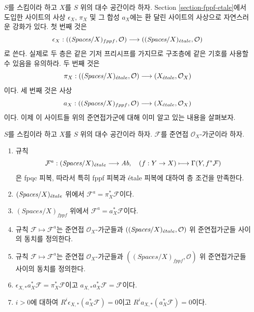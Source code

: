 \medskip\noindent
$S$를 스킴이라 하고 $X$를 $S$ 위의 대수 공간이라 하자.
Section \ref{section-fppf-etale}에서 도입한 사이트의 사상
$\epsilon_X$, $\pi_X$ 및 그 합성 $a_X$에는 환 달린 사이트의 사상으로
자연스러운 강화가 있다. 첫 번째 것은
$$
\epsilon_X :
((\textit{Spaces}/X)_{fppf}, \mathcal{O})
\longrightarrow
((\textit{Spaces}/X)_{\acute{e}tale}, \mathcal{O})
$$
로 쓴다. 실제로 두 층은 같은 기저 프리시프를 가지므로 구조층에
같은 기호를 사용할 수 있음을 유의하라. 두 번째 것은
$$
\pi_X :
((\textit{Spaces}/X)_{\acute{e}tale}, \mathcal{O})
\longrightarrow
(X_{\acute{e}tale}, \mathcal{O}_X)
$$
이다. 세 번째 것은 사상
$$
a_X :
((\textit{Spaces}/X)_{fppf}, \mathcal{O})
\longrightarrow
(X_{\acute{e}tale}, \mathcal{O}_X)
$$
이다. 이제 이 사이트들 위의 준연접가군에 대해 이미 알고 있는
내용을 살펴보자.

\begin{lemma}
\label{lemma-review-quasi-coherent}
$S$를 스킴이라 하고 $X$를 $S$ 위의 대수 공간이라 하자.
$\mathcal{F}$를 준연접 $\mathcal{O}_X$-가군이라 하자.
\begin{enumerate}
\item 규칙
$$
\mathcal{F}^a : (\textit{Spaces}/X)_{\acute{e}tale} \longrightarrow \textit{Ab},\quad
(f : Y \to X) \longmapsto \Gamma(Y, f^*\mathcal{F})
$$
은 fpqc 피복, 따라서 특히 fppf 피복과 \'etale 피복에 대하여
층 조건을 만족한다.
\item $(\textit{Spaces}/X)_{\acute{e}tale}$ 위에서
$\mathcal{F}^a = \pi_X^*\mathcal{F}$이다.
\item $(\textit{Spaces}/X)_{fppf}$ 위에서
$\mathcal{F}^a = a_X^*\mathcal{F}$이다.
\item 규칙 $\mathcal{F} \mapsto \mathcal{F}^a$는 준연접
$\mathcal{O}_X$-가군들과
$((\textit{Spaces}/X)_{\acute{e}tale}, \mathcal{O})$ 위 준연접가군들 사이의
동치를 정의한다.
\item 규칙 $\mathcal{F} \mapsto \mathcal{F}^a$는 준연접
$\mathcal{O}_X$-가군들과
$((\textit{Spaces}/X)_{fppf}, \mathcal{O})$ 위 준연접가군들 사이의
동치를 정의한다.
\item $\epsilon_{X, *}a_X^*\mathcal{F} = \pi_X^*\mathcal{F}$이고
$a_{X, *}a_X^*\mathcal{F} = \mathcal{F}$이다.
\item $i > 0$에 대하여 $R^i\epsilon_{X, *}(a_X^*\mathcal{F}) = 0$이고
$R^ia_{X, *}(a_X^*\mathcal{F}) = 0$이다.
\end{enumerate}
\end{lemma}

